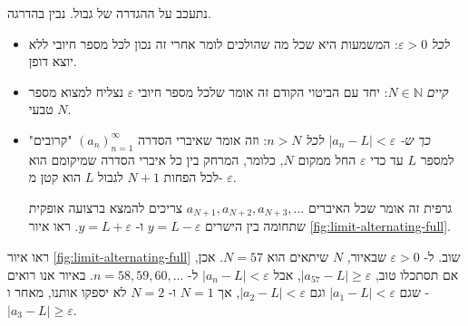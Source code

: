 \documentclass{article}
\begin{document}
נתעכב על ההגדרה של גבול. נבין בהדרגה. 
\begin{itemize}
    \item 
{\it לכל $\varepsilon>0$}:
המשמעות היא שכל מה שהולכים לומר אחרי זה נכון לכל מספר חיובי ללא יוצא דופן. 
\item 
{\it קיים $N\in\mathbb{N}$}: 
יחד עם הביטוי הקודם זה אומר שלכל מספר חיובי 
$\varepsilon$
נצליח למצוא מספר טבעי 
$N$. 
\item 
{\it כך ש- $|a_n-L|<\varepsilon$ לכל $n>N$}: 
וזה אומר שאיברי הסדרה 
$(a_n)_{n=1}^\infty$ 
"קרובים" למספר
$L$ 
עד כדי 
$\varepsilon$ 
החל ממקום 
$N$, 
כלומר, המרחק בין כל איברי הסדרה שמיקומם הוא לכל הפחות 
$N+1$ 
לגבול 
$L$ 
הוא קטן מ- 
$\varepsilon$. 

גרפית זה אומר שכל האיברים 
$a_{N+1},a_{N+2},a_{N+3},\ldots$ 
צריכים להמצא ברצועה אופקית שתחומה בין הישרים 
$y=L-\varepsilon$ 
ו- 
$y=L+\varepsilon$. 
ראו איור 
\ref{fig:limit-alternating-full}. 
\end{itemize}
ראו איור
\ref{fig:limit-alternating-full} 
שוב. 
ל- 
$\varepsilon>0$ 
שבאיור, 
$N$ 
שיתאים הוא 
$N=57$. 
אכן, אם תסתכלו טוב, 
$|a_{57}-L|\geq\varepsilon$, 
אבל 
$|a_n-L|<\varepsilon$ 
ל- 
$n=58,59,60,\ldots$. 
באיור אנו רואים שגם 
$|a_1-L|<\varepsilon$ 
וגם 
$|a_2-L|<\varepsilon$, 
אך 
$N=1$ 
ו- 
$N=2$ 
לא יספקו אותנו, מאחר ו -
$|a_3-L|\geq\varepsilon$. 
\end{document}

